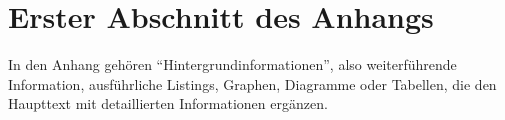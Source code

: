 \chapter{Erster Abschnitt des Anhangs}
In den Anhang gehören "`Hintergrundinformationen"', also weiterführende Information, ausführliche Listings, Graphen, Diagramme oder Tabellen, die den Haupttext mit detaillierten Informationen ergänzen. 

\blindtext
\blindtext
\blindtext

